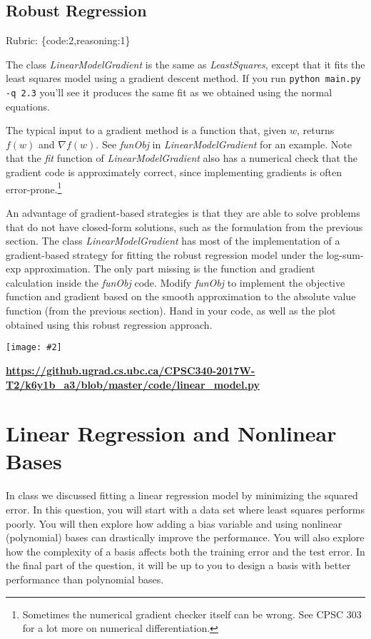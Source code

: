 \documentclass{article}
\def\rubric#1{\gre{Rubric: \{#1\}}}{}
\def\blu#1{{\color{blu}#1}}
\def\gre#1{{\color{gre}#1}}
\newcommand{\centerfig}[2]{\begin{center}\texttt{[image: \#2]}\end{center}}
\begin{document}
\subsection{Robust Regression}
\rubric{code:2,reasoning:1}

The class \emph{LinearModelGradient} is the same as \emph{LeastSquares}, except that it fits the least squares model using a gradient descent method. If you run \verb|python main.py -q 2.3| you'll see it produces the same fit as we obtained using the normal equations.

The typical input to a gradient method is a function that, given $w$, returns $f(w)$ and $\nabla f(w)$. See \emph{funObj} in \emph{LinearModelGradient} for an example. Note that the \emph{fit} function of \emph{LinearModelGradient} also has a numerical check that the gradient code is approximately correct, since implementing gradients is often error-prone.\footnote{Sometimes the numerical gradient checker itself can be wrong. See CPSC 303 for a lot more on numerical differentiation.}

An advantage of gradient-based strategies is that they are able to solve
problems that do not have closed-form solutions, such as the formulation from the
previous section. The class \emph{LinearModelGradient} has most of the implementation
of a gradient-based strategy for fitting the robust regression model under the log-sum-exp approximation.
The only part missing is the function and gradient calculation inside the \emph{funObj} code.
\blu{Modify \emph{funObj} to implement the objective function and gradient based on the smooth
approximation to the absolute value function (from the previous section). Hand in your code, as well
as the plot obtained using this robust regression approach.}
\centerfig{.5}{../figs/least_squares_robust.pdf}
\textbf{\url{https://github.ugrad.cs.ubc.ca/CPSC340-2017W-T2/k6y1b_a3/blob/master/code/linear_model.py}}

\section{Linear Regression and Nonlinear Bases}

In class we discussed fitting a linear regression model by minimizing the squared error.
In this question, you will start with a data set where least squares performs poorly.
You will then explore how adding a bias variable and using nonlinear (polynomial) bases can drastically improve the performance.
You will also explore how the complexity of a basis affects both the training error and the test error.
In the final part of the question, it will be up to you to design a basis with better performance than polynomial bases.
\end{document}
